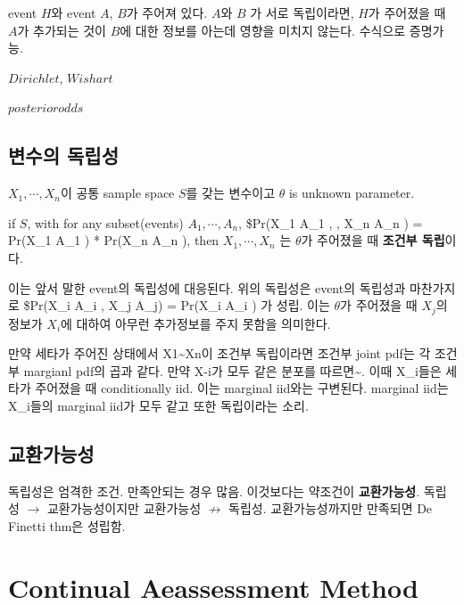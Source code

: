 \documentclass[
]{book}
\begin{document}
event \(H\)와 event \(A\), \(B\)가 주어져 있다. \(A\)와 \(B\) 가 서로 독립이라면, \(H\)가 주어졌을 때 \(A\)가 추가되는 것이 \(B\)에 대한 정보를 아는데 영향을 미치지 않는다. 수식으로 증명가능.

\(Dirichlet\), \(Wishart\)

\(posterior odds\)

\hypertarget{uxbcc0uxc218uxc758-uxb3c5uxb9bduxc131}{%
\subsection{변수의 독립성}\label{uxbcc0uxc218uxc758-uxb3c5uxb9bduxc131}}

\(X_1 , \cdots, X_n\)이 공통 sample space \(S\)를 갖는 변수이고 \(\theta\) is unknown parameter.

if \(S\), with for any subset(events) \(A_1 , \cdots, A_n\), \$Pr(X\_1 \in A\_1 , \cdots, X\_n \in A\_n \rvert \theta) = Pr(X\_1 \in A\_1 \rvert \theta) * \cdots *  Pr(X\_n \in A\_n \rvert \theta), then \(X_1 , \cdots, X_n\) 는 \(\theta\)가 주어졌을 때 \textbf{조건부 독립}이다.

이는 앞서 말한 event의 독립성에 대응된다. 위의 독립성은 event의 독립성과 마찬가지로 \$Pr(X\_i \in A\_i \rvert \theta, X\_j \in A\_j) = Pr(X\_i \in A\_i \rvert \theta) 가 성립. 이는 \(\theta\)가 주어졌을 때 \(X_j\)의 정보가 \(X_i\)에 대하여 아무런 추가정보를 주지 못함을 의미한다.

만약 세타가 주어진 상태에서 X1\textasciitilde Xn이 조건부 독립이라면 조건부 joint pdf는 각 조건부 margianl pdf의 곱과 같다. 만약 X-i가 모두 같은 분포를 따르면\textasciitilde. 이때 X\_i들은 세타가 주어졌을 때 conditionally iid. 이는 marginal iid와는 구변된다. marginal iid는 X\_i들의 marginal iid가 모두 같고 또한 독립이라는 소리.

\hypertarget{uxad50uxd658uxac00uxb2a5uxc131}{%
\subsection{교환가능성}\label{uxad50uxd658uxac00uxb2a5uxc131}}

독립성은 엄격한 조건. 만족안되는 경우 많음. 이것보다는 약조건이 \textbf{교환가능성}. 독립성 \(\rightarrow\) 교환가능성이지만 교환가능성 \(\not \rightarrow\) 독립성. 교환가능성까지만 만족되면 De Finetti thm은 성립함.

\hypertarget{continual-aeassessment-method}{%
\section{Continual Aeassessment Method}\label{continual-aeassessment-method}}
\end{document}
